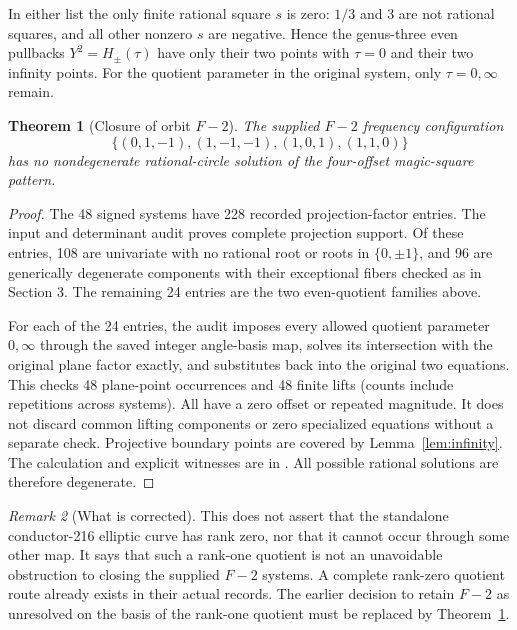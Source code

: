\documentclass[11pt]{article}
\newtheorem{theorem}{Theorem}[section]
\theoremstyle{remark}\newtheorem{remark}[theorem]{Remark}
\begin{document}
In either list the only finite rational square $s$ is zero: $1/3$ and $3$ are not rational squares, and all other nonzero $s$ are negative. Hence the genus-three even pullbacks $Y^2=H_\pm(\tau)$ have only their two points with $\tau=0$ and their two infinity points. For the quotient parameter in the original system, only $\tau=0,\infty$ remain.

\begin{theorem}[Closure of orbit $F{-}2$]\label{thm:F2}
The supplied $F{-}2$ frequency configuration
\[
\{(0,1,-1),(1,-1,-1),(1,0,1),(1,1,0)\}
\]
has no nondegenerate rational-circle solution of the four-offset magic-square pattern.
\end{theorem}
\begin{proof}
The 48 signed systems have 228 recorded projection-factor entries. The input and determinant audit proves complete projection support. Of these entries, 108 are univariate with no rational root or roots in $\{0,\pm1\}$, and 96 are generically degenerate components with their exceptional fibers checked as in Section 3. The remaining 24 entries are the two even-quotient families above.

For each of the 24 entries, the audit imposes every allowed quotient parameter $0,\infty$ through the saved integer angle-basis map, solves its intersection with the original plane factor exactly, and substitutes back into the original two equations. This checks 48 plane-point occurrences and 48 finite lifts (counts include repetitions across systems). All have a zero offset or repeated magnitude. It does not discard common lifting components or zero specialized equations without a separate check. Projective boundary points are covered by Lemma~\ref{lem:infinity}. The calculation and explicit witnesses are in . All possible rational solutions are therefore degenerate.
\end{proof}

\begin{remark}[What is corrected]
This does not assert that the standalone conductor-216 elliptic curve has rank zero, nor that it cannot occur through some other map. It says that such a rank-one quotient is not an unavoidable obstruction to closing the supplied $F{-}2$ systems. A complete rank-zero quotient route already exists in their actual records. The earlier decision to retain $F{-}2$ as unresolved on the basis of the rank-one quotient must be replaced by Theorem~\ref{thm:F2}.
\end{remark}
\end{document}
